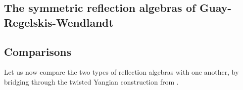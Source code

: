     \subsection{The symmetric reflection algebras of Guay-Regelskis-Wendlandt}

    \subsection{Comparisons}
        Let us now compare the two types of reflection algebras with one another, by bridging through the twisted Yangian construction from \cite{guay_regelskis_wendlandt_representations_of_twisted_yangians_for_symmetric_pairs_of_types_BCD_1}.